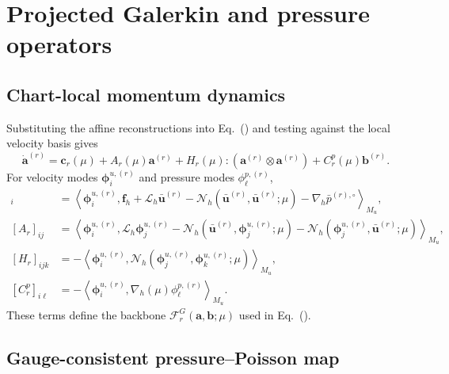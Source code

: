 \section{Projected Galerkin and pressure operators}
\label{app:rom}

\subsection{Chart-local momentum dynamics}

Substituting the affine reconstructions into Eq.~() and testing against the local velocity basis gives
\begin{equation}
 \dot{\bm a}^{(r)}=\bm c_r(\mu)+A_r(\mu)\bm a^{(r)}
 +H_r(\mu):(\bm a^{(r)}\otimes\bm a^{(r)})+C_r^p(\mu)\bm b^{(r)}.
 \label{eq:app_projected_momentum}
\end{equation}
For velocity modes $\bm\phi_i^{u,(r)}$ and pressure modes $\phi_\ell^{p,(r)}$,
\begin{align}
 [\bm c_r]_i
 &=\left\langle\bm\phi_i^{u,(r)},
 \bm f_h+\mathcal L_h\bar{\bm u}^{(r)}
 -\mathcal N_h(\bar{\bm u}^{(r)},\bar{\bm u}^{(r)};\mu)
 -\nabla_h\bar p^{(r),\circ}\right\rangle_{M_u},\\
 [A_r]_{ij}
 &=\left\langle\bm\phi_i^{u,(r)},
 \mathcal L_h\bm\phi_j^{u,(r)}
 -\mathcal N_h(\bar{\bm u}^{(r)},\bm\phi_j^{u,(r)};\mu)
 -\mathcal N_h(\bm\phi_j^{u,(r)},\bar{\bm u}^{(r)};\mu)
 \right\rangle_{M_u},\\
 [H_r]_{ijk}
 &=-\left\langle\bm\phi_i^{u,(r)},
 \mathcal N_h(\bm\phi_j^{u,(r)},\bm\phi_k^{u,(r)};\mu)
 \right\rangle_{M_u},\\
 [C_r^p]_{i\ell}
 &=-\left\langle\bm\phi_i^{u,(r)},\nabla_h(\mu)\phi_\ell^{p,(r)}\right\rangle_{M_u}.
 \label{eq:app_projected_operators}
\end{align}
These terms define the backbone $\mathcal F_r^G(\bm a,\bm b;\mu)$ used in Eq.~().

\subsection{Gauge-consistent pressure--Poisson map}

